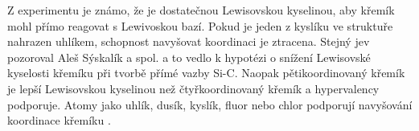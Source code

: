 \documentclass[
  digital, %
  table,   %
  lof,     %
  lot,     %
  oneside,
]{fithesis3}
\begin{document}
\begin{figure}
\begin{center}
\label{shrnuti_struktury_kremik}
\end{center}
\end{figure}
Z experimentu je známo, že  je dostatečnou Lewisovskou kyselinou, aby křemík mohl přímo reagovat s Lewivoskou bazí. Pokud je jeden z kyslíku ve struktuře nahrazen uhlíkem, schopnost navyšovat koordinaci je ztracena. Stejný jev pozoroval Aleš Sýskalík a spol. \cite{Styskalik2015thesis} a to vedlo k hypotézi o snížení Lewisovské kyselosti křemíku při tvorbě přímé vazby Si-C. Naopak pětikoordinovaný křemík je lepší Lewisovskou kyselinou než čtyřkoordinovaný křemík a hypervalency podporuje. Atomy jako uhlík, dusík, kyslík, fluor nebo chlor podporují navyšování koordinace křemíku \cite{Wagler2014}.\\
\end{document}
